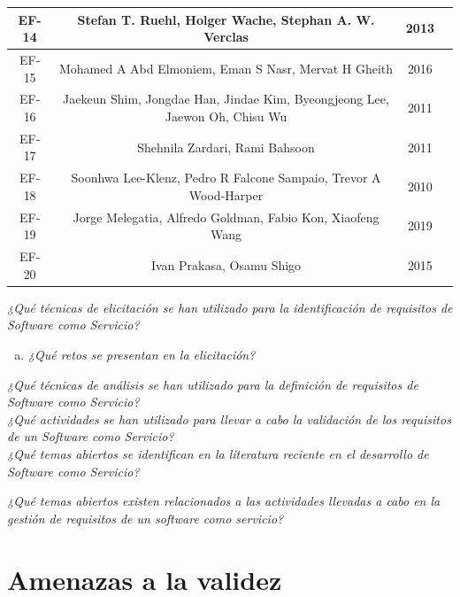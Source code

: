 \documentclass[conference,onecolumn,10pt]{IEEEtran}
\begin{document}
\begin{table}[ht]
{\begin{tabular}{c c c c}
                \hline 
                EF-14 & Stefan T. Ruehl, Holger Wache, Stephan A. W. Verclas & 2013 & \cite{EF-14} \\
                \hline 
                EF-15 & Mohamed A Abd Elmoniem, Eman S Nasr, Mervat H Gheith & 2016 & \cite{EF-15} \\
                \hline 
                EF-16 & Jaekeun Shim, Jongdae  Han, Jindae  Kim, Byeongjeong  Lee, Jaewon  Oh, Chisu  Wu  & 2011 & \cite{EF-16} \\
                \hline 
                EF-17 & Shehnila Zardari, Rami  Bahsoon & 2011 & \cite{EF-17} \\
                \hline 
                EF-18 & Soonhwa Lee-Klenz, Pedro R Falcone Sampaio, Trevor A Wood-Harper  & 2010 & \cite{EF-18} \\
                \hline 
                EF-19 & Jorge Melegatia, Alfredo Goldman, Fabio Kon, Xiaofeng Wang & 2019 & \cite{EF-19} \\
                \hline 
                EF-20 & Ivan Prakasa, Osamu Shigo & 2015 & \cite{EF-20} \\
                \hline 
        \end{tabular}}
        \label{table:tablaterminos}
\end{table}
\newpage

\emph{¿Qué técnicas de elicitación se han utilizado para la identificación de requisitos de Software como Servicio?}
  \begin{enumerate}[(a)]
  \item \emph{¿Qué retos se presentan en la elicitación?}
  \end{enumerate}

\emph{¿Qué técnicas de análisis se han utilizado para la definición de requisitos de Software como Servicio?}\\

\emph{¿Qué actividades se han utilizado para llevar a cabo la validación de los requisitos de un Software como Servicio?}\\

\emph{¿Qué temas abiertos se identifican en la literatura reciente en el desarrollo de Software como Servicio?}

\emph{¿Qué temas abiertos existen relacionados a las actividades llevadas a cabo en la gestión de requisitos de un software como servicio?}

\section{Amenazas a la validez}
\end{document}
